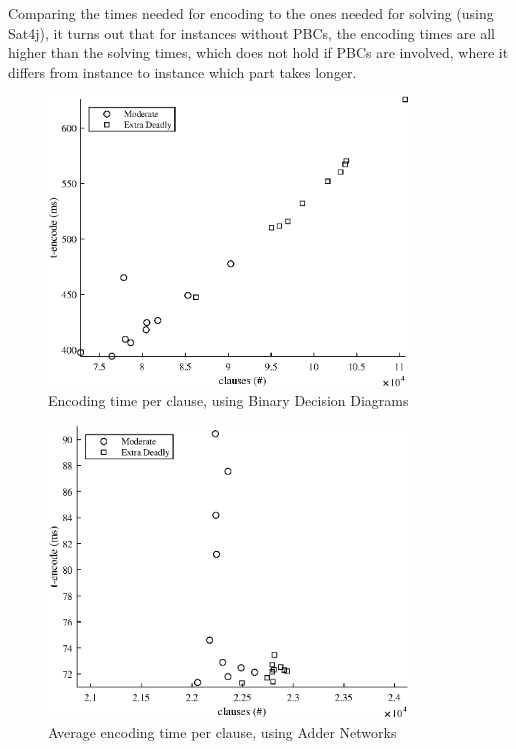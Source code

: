 Comparing the times needed for encoding to the ones needed for solving (using Sat4j), it turns out that for instances without PBCs, the encoding times are all higher than the solving times, which does not hold if PBCs are involved, where it differs from instance to instance which part takes longer.






\clearpage
\FloatBarrier
{
\renewcommand{\figurename}{Plot}
\begin{figure}
    \centering
    \includegraphics[width = 0.85\textwidth]{Figures/killer_BDD_encode.eps}
    \caption{Encoding time per clause, using Binary Decision Diagrams}
    \label{killerBDDencode}
\end{figure}
\begin{figure}
    \centering
    \includegraphics[width = 0.85\textwidth]{Figures/killer_AN_encode.eps}
    \caption{Average encoding time per clause, using Adder Networks}
    \label{killerANencode}
\end{figure}

}
